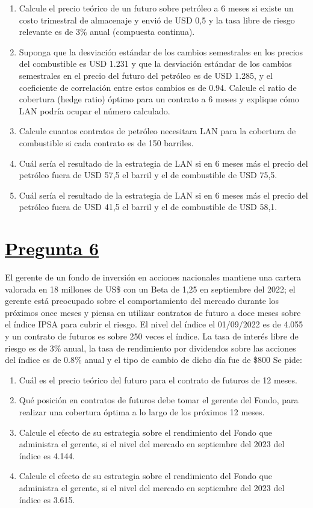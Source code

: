 \documentclass[12pt]{article}
\newcommand{\subrayadoRojo}[1]{{\color{rojoudp}\underline{\textcolor{black}{#1}}}}
\begin{document}
    \begin{enumerate}[label=\textbf{\alph*)}]
        \item Calcule el precio teórico de un futuro sobre petróleo a 6 meses si existe un costo trimestral de almacenaje y 
        envió de USD 0,5 y la tasa libre de riesgo relevante es de 3\% anual (compuesta continua).
        \item Suponga que la desviación estándar de los cambios semestrales en los precios del combustible es USD 1.231 y 
        que la desviación estándar de los cambios semestrales en el precio del futuro del petróleo es de USD 1.285, y el coeficiente 
        de correlación entre estos cambios es de 0.94. Calcule el ratio de cobertura (hedge ratio) óptimo para un contrato a 6 meses 
        y explique cómo LAN podría ocupar el número calculado.
        \item Calcule cuantos contratos de petróleo necesitara LAN para la cobertura de combustible si cada contrato es de 150 barriles.
        \item Cuál sería el resultado de la estrategia de LAN si en 6 meses más el precio del petróleo fuera de USD 57,5 el barril y el de combustible de USD 75,5.
        \item Cuál sería el resultado de la estrategia de LAN si en 6 meses más el precio del petróleo fuera de USD 41,5 el barril y el de combustible de USD 58,1.
\end{enumerate}

\section*{\subrayadoRojo{Pregunta 6}}
El gerente de un fondo de inversión en acciones nacionales mantiene una cartera valorada en 18 millones de US\$ con un Beta de 
1,25 en septiembre del 2022; el gerente está preocupado sobre el comportamiento del mercado durante los próximos once meses y 
piensa en utilizar contratos de futuro a doce meses sobre el índice IPSA para cubrir el riesgo. El nivel del índice el 01/09/2022 
es de 4.055 y un contrato de futuros es sobre 250 veces el índice. La tasa de interés libre de riesgo es de 3\% anual, la tasa de 
rendimiento por dividendos sobre las acciones del índice es de 0.8\% anual y el tipo de cambio de dicho día fue de \$800  Se pide:
\begin{enumerate}[label=\textbf{\alph*)}]
    \item Cuál es el precio teórico del futuro para el contrato de futuros de 12 meses.
    \item Qué posición en contratos de futuros debe tomar el gerente del Fondo, para realizar una cobertura óptima a lo largo de los próximos 12 meses.
    \item Calcule el efecto de su estrategia sobre el rendimiento del Fondo que administra el gerente, si el nivel del mercado en septiembre del 2023 del índice es 4.144.
    \item Calcule el efecto de su estrategia sobre el rendimiento del Fondo que administra el gerente, si el nivel del mercado en septiembre del 2023 del índice es 3.615.

\end{enumerate}
    
\end{document}
